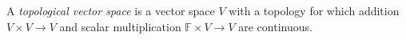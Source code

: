 
A \emph{topological vector space} is a vector space $V$ with a topology for which addition $V\times V\to V$ and scalar multiplication $\mathbb F\times V\to V$ are continuous.
